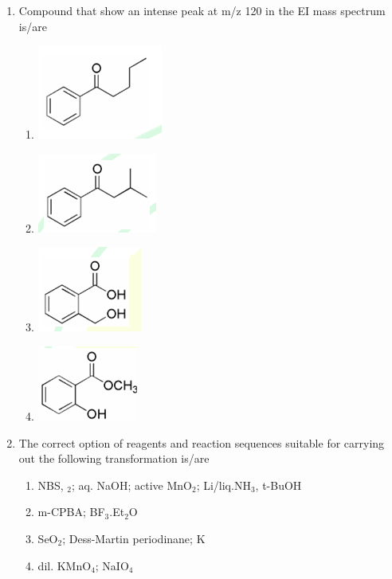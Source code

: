 \documentclass[journal,12pt,onecolumn]{IEEEtran}
\theoremstyle{remark}
\begin{document}
\begin{enumerate}
\item Compound that show an intense peak at m/z 120 in the EI mass spectrum is/are
    \begin{enumerate}
        \item \includegraphics[width=0.2\columnwidth]{figs/q24a.png}
        \item \includegraphics[width=0.2\columnwidth]{figs/q24b.png}
        \item \includegraphics[width=0.2\columnwidth]{figs/q24c.png}
        \item \includegraphics[width=0.2\columnwidth]{figs/q24d.png}
    \end{enumerate}      \hfill{}



\item The correct option of reagents and reaction sequences suitable for carrying out the following transformation is/are
    \begin{enumerate}
        \item {} NBS, $_{2}$;  aq. NaOH;  active MnO$_{2}$;  Li/liq.NH$_{3}$, t-BuOH
        \item {} m-CPBA;  BF$_{3}$.Et$_{2}$O
        \item {} SeO$_{2}$;  Dess-Martin periodinane;  K 
        \item {} dil. KMnO$_{4}$;  NaIO$_{4}$
    \end{enumerate}      \hfill{}




\end{enumerate}
\end{document}
